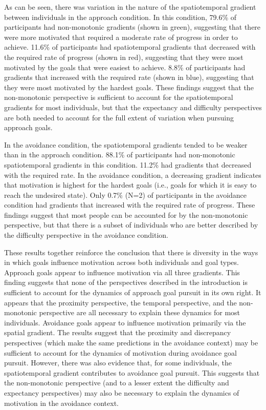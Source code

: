 \documentclass[a4paper,doc,natbib,donotrepeattitle]{apa6}
\begin{document}
As can be seen, there was variation in the nature of the spatiotemporal gradient between individuals in the approach condition. In this condition, 79.6\% of participants had non-monotonic gradients (shown in green), suggesting that there were more motivated that required a moderate rate of progress in order to achieve. 11.6\% of participants had spatiotemporal gradients that decreased with the required rate of progress (shown in red), suggesting that they were most motivated by the goals that were easiest to achieve. 8.8\% of participants had gradients that increased with the required rate (shown in blue), suggesting that they were most motivated by the hardest goals. These findings suggest that the non-monotonic perspective is sufficient to account for the spatiotemporal gradients for most individuals, but that the expectancy and difficulty perspectives are both needed to account for the full extent of variation when pursuing approach goals.

In the avoidance condition, the spatiotemporal gradients tended to be weaker than in the approach condition. 88.1\% of participants had non-monotonic spatiotemporal gradients in this condition. 11.2\% had gradients that decreased with the required rate. In the avoidance condition, a decreasing gradient indicates that motivation is highest for the hardest goals (i.e., goals for which it is easy to reach the undesired state). Only 0.7\% (N=2) of participants in the avoidance condition had gradients that increased with the required rate of progress. These findings suggest that most people can be accounted for by the non-monotonic perspective, but that there is a subset of individuals who are better described by the difficulty perspective in the avoidance condition.

These results together reinforce the conclusion that there is diversity in the ways in which goals influence motivation across both individuals and goal types. Approach goals appear to influence motivation via all three gradients. This finding suggests that none of the perspectives described in the introduction is sufficient to account for the dynamics of approach goal pursuit in its own right. It appears that the proximity perspective, the temporal perspective, and the non-monotonic perspective are all necessary to explain these dynamics for most individuals. Avoidance goals appear to influence motivation primarily via the spatial gradient. The results suggest that the proximity and discrepancy perspectives (which make the same predictions in the avoidance context) may be sufficient to account for the dynamics of motivation during avoidance goal pursuit. However, there was also evidence that, for some individuals, the spatiotemporal gradient contributes to avoidance goal pursuit. This suggests that the non-monotonic perspective (and to a lesser extent the difficulty and expectancy perspectives) may also be necessary to explain the dynamics of motivation in the avoidance context.
\end{document}
